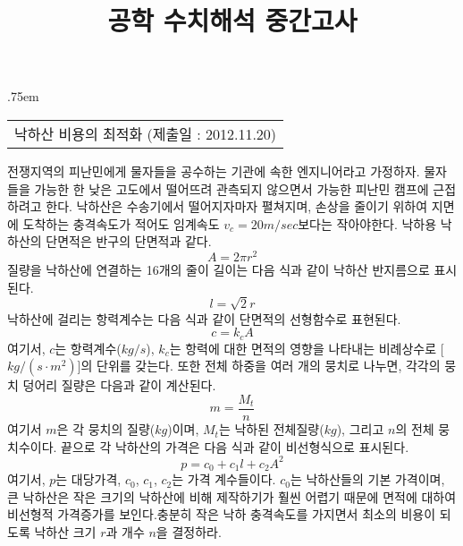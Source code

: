 \documentclass[a4,10pt]{article}
\title{공학 수치해석 중간고사}
\author{}
\makeatletter
\theoremstyle{examplestyle}
\let\\\tabularnewline
\let\\\tabularnewline
\renewcommand{\tableofcontents}[1][\contentsname]{%
  \section*{#1}
  \begin{multicols}{2}
    \@starttoc{toc}
  \end{multicols}
}
\makeatother
\begin{document}
\begin{center}
{\lineskip .75em\begin{tabular}[t]{c}\LARGE{낙하산 비용의 최적화} \large{(제출일 : 2012.11.20)}\end{tabular}\par}%
\end{center}
전쟁지역의 피난민에게 물자들을 공수하는 기관에 속한 엔지니어라고 가정하자. 물자들을 가능한 한 낮은 고도에서 떨어뜨려 관측되지 않으면서 가능한 피난민 캠프에 근접하려고 한다. 낙하산은 수송기에서 떨어지자마자 펼쳐지며, 손상을 줄이기 위하여 지면에 도착하는 충격속도가 적어도 임계속도 $v_{c}=20 m/sec$보다는 작아야한다. 낙하용 낙하산의 단면적은 반구의 단면적과 같다.
\begin{equation*}
A=2\pi r^2
\end{equation*}
질량을 낙하산에 연결하는 16개의 줄이 길이는 다음 식과 같이 낙하산 반지름으로 표시된다.
\begin{equation*}
l=\sqrt{2}r
\end{equation*}
낙하산에 걸리는 항력계수는 다음 식과 같이 단면적의 선형함수로 표현된다.
\begin{equation*}
c=k_{c}A
\end{equation*}
여기서, $c$는 항력계수($kg/s$), $k_{c}$는 항력에 대한 면적의 영향을 나타내는 비례상수로 [$kg/(s\cdot m^{2})$]의 단위를 갖는다. 또한 전체 하중을 여러 개의 뭉치로 나누면, 각각의 뭉치 덩어리 질량은 다음과 같이 계산된다.
\begin{equation*}
m=\frac{M_{t}}{n}
\end{equation*}
여기서 $m$은 각 뭉치의 질량($kg$)이며, $M_{t}$는 낙하된 전체질량($kg$), 그리고 $n$의 전체 뭉치수이다. 끝으로 각 낙하산의 가격은 다음 식과 같이 비선형식으로 표시된다.
\begin{equation*}
p=c_{0}+c_{1}l+c_{2}A^{2}
\end{equation*}
여기서, $p$는 대당가격, $c_{0}$, $c_{1}$, $c_{2}$는 가격 계수들이다. $c_{0}$는 낙하산들의 기본 가격이며, 큰 낙하산은 작은 크기의 낙하산에 비해 제작하기가 훨씬 어렵기 때문에 면적에 대하여 비선형적 가격증가를 보인다.\\충분히 작은 낙하 충격속도를 가지면서 최소의 비용이 되도록 낙하산 크기 $r$과 개수 $n$을 결정하라.\\
\end{document}
